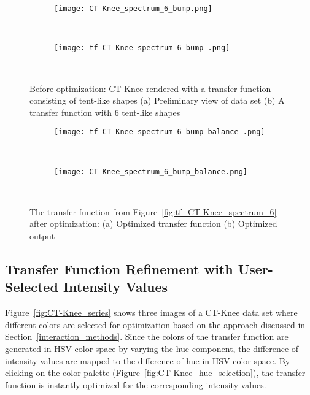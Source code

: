 \begin{figure}
\centering

\begin{subfigure}{0.33\textwidth}
\texttt{[image: CT-Knee\_spectrum\_6\_bump.png]}
\caption{~}
\end{subfigure}
\begin{subfigure}{0.33\textwidth}
\texttt{[image: tf\_CT-Knee\_spectrum\_6\_bump\_.png]}
\caption{~}
\label{fig:tf_CT-Knee_spectrum_6_bump_}
\end{subfigure}
\caption[Before optimization: CT-Knee with a transfer function of tent-like shapes]
{Before optimization: CT-Knee rendered with a transfer function consisting 
of tent-like shapes (a) Preliminary view of data set (b) A transfer function with 6 tent-like shapes}
\label{fig:tf_CT-Knee_spectrum_6}

\begin{subfigure}{0.33\textwidth}
\texttt{[image: tf\_CT-Knee\_spectrum\_6\_bump\_balance\_.png]}
\caption{~}
\end{subfigure}
\begin{subfigure}{0.33\textwidth}
\texttt{[image: CT-Knee\_spectrum\_6\_bump\_balance.png]}
\caption{~}
\end{subfigure}
\caption[After optimization: CT-Knee rendered with the transfer function of tent-like shapes]
{The transfer function from Figure~\ref{fig:tf_CT-Knee_spectrum_6} after optimization: (a) Optimized transfer function (b) Optimized output}
\label{fig:tf_CT-Knee_spectrum_6_balance_1000}
\end{figure}

\subsection{Transfer Function Refinement with User-Selected Intensity Values}
Figure~\ref{fig:CT-Knee_series} shows three images of a CT-Knee data set where different colors are selected for optimization based on the approach discussed in Section~\ref{interaction_methods}. Since the colors of the transfer function are generated in HSV color space by varying the hue component, the difference of intensity values are mapped to the difference of hue in HSV color space. By clicking on the color palette (Figure~\ref{fig:CT-Knee_hue_selection}), the transfer function is instantly optimized for the corresponding intensity values.

